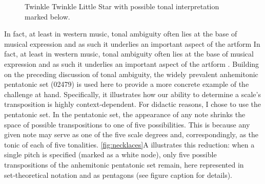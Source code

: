 \documentclass[10pt,twocolumn]{article}
\numberwithin{equation}{section} %
\begin{document}
    \begin{figure}[htbp]
        \centering
        \caption{Twinkle Twinkle Little Star with possible tonal interpretation marked below.}
        \label{fig:twinkle}
    \end{figure}

    In fact, at least in western music, tonal ambiguity often lies at the base of musical expression and as such it underlies an important aspect of the artform In fact, at least in western music, tonal ambiguity often lies at the base of musical expression and as such it underlies an important aspect of the artform \citep{NodenSkinner1984, Richards2017, Smith1992, Temperley2007, Uchida1990}.
    Building on the preceding discussion of tonal ambiguity, the widely prevalent anhemitonic pentatonic set (02479) is used here to provide a more concrete example of the challenge at hand.
    Specifically, it illustrates how our ability to determine a scale's transposition is highly context‑dependent.
    For didactic reasons, I chose to use the pentatonic set.
    In the pentatonic set, the appearance of any note shrinks the space of possible transpositions to one of five possibilities.
    This is because any given note may serve as one of the five scale degrees and, correspondingly, as the tonic of each of five tonalities.
    \autoref{fig:necklaces}A illustrates this reduction: when a single pitch is specified (marked as a white node), only five possible transpositions of the anhemitonic pentatonic set remain, here represented in set‑theoretical notation and as pentagons (see figure caption for details).
\end{document}
